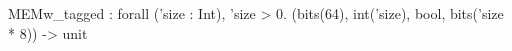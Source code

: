 MEMw_tagged : forall ('size : Int), 'size > 0. (bits(64), int('size), bool, bits('size * 8)) -> unit